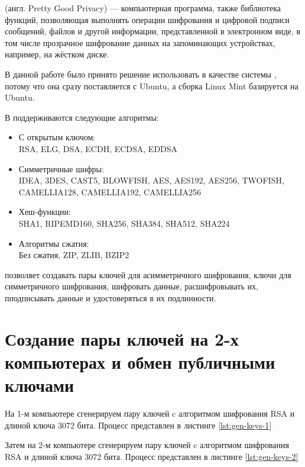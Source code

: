  (англ. Pretty Good Privacy) --- компьютерная программа, также библиотека функций, позволяющая выполнять операции шифрования и цифровой подписи сообщений, файлов и другой информации, представленной в электронном виде, в том числе прозрачное шифрование данных на запоминающих устройствах, например, на жёстком диске.

В данной работе было принято решение использовать в качестве  системы , потому что она сразу поставляется с Ubuntu, а сборка Linux Mint базируется на Ubuntu.

В  поддерживаются следующие алгоритмы:
\begin{itemize}
	\item С открытым ключом:\\RSA, ELG, DSA, ECDH, ECDSA, EDDSA
	\item Симметричные шифры:\\IDEA, 3DES, CAST5, BLOWFISH, AES, AES192, AES256, TWOFISH, CAMELLIA128, CAMELLIA192, CAMELLIA256
	\item Хеш-функции:\\SHA1, RIPEMD160, SHA256, SHA384, SHA512, SHA224
	\item Алгоритмы сжатия:\\Без сжатия, ZIP, ZLIB, BZIP2
\end{itemize}

 позволяет создавать пары ключей для асимметричного шифрования, ключи для симметричного шифрования, шифровать данные, расшифровывать их, пподписывать данные и удостоверяться в их подлинности.
             
\section{Создание пары  ключей на 2-х компьютерах и обмен публичными ключами}

На 1-м компьютере сгенерируем пару  ключей c алгоритмом шифрования RSA и длиной ключа 3072 бита. Процесс представлен в листинге \ref{lst:gen-keys-1}



Затем на 2-м компьютере сгенерируем пару  ключей c алгоритмом шифрования RSA и длиной ключа 3072 бита. Процесс представлен в листинге \ref{lst:gen-keys-2}




